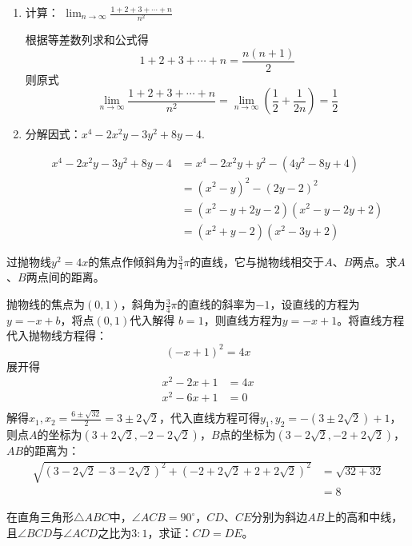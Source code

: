 \documentclass[answers]{exam}
\begin{document}
\begin{questions}
\begin{enumerate}[label=(\arabic*)]
\begin{solution}
		      \end{solution}
		\item 计算： \( \displaystyle \lim_{n\to\infty}\frac{1+2+3+\cdots+n}{n^2} \)
		      \begin{solution}
			      根据等差数列求和公式得
			      \begin{equation*}
				      1 + 2 + 3 + \cdots + n = \frac{n(n+1)}{2}
			      \end{equation*}
			      则原式
			      \begin{equation*}
				      \lim_{n\to\infty}\frac{1+2+3+\cdots+n}{n^2} = \lim_{n\to\infty}(\frac12 + \frac{1}{2n}) = \frac12
			      \end{equation*}
		      \end{solution}
		\item 分解因式：$ x^4 - 2x^2y - 3y^2 + 8y - 4 $.
		      \begin{solution}
			      \begin{align*}
				      x^4 - 2x^2y - 3y^2 + 8y - 4 & = x^4 - 2x^2y + y^2 - (4y^2 - 8y + 4)  \\
				                                  & = (x^2 - y)^2 - (2y - 2)^2             \\
				                                  & = (x^2 - y + 2y - 2)(x^2 - y - 2y + 2) \\
				                                  & = (x^2 + y - 2)(x^2 - 3y + 2)
			      \end{align*}
		      \end{solution}
	\end{enumerate}
	\question 过抛物线$ y^2 = 4x
	$的焦点作倾斜角为$\frac34\pi$的直线，它与抛物线相交于$A$、$B$两点。求$A$、$B$两点间的距离。
	\begin{solution}
		抛物线的焦点为$(0,1)$，斜角为$\frac34\pi$的直线的斜率为$-1$，设直线的方程为$ y = -x + b $，将点$(0,1)$代入解得
		$b = 1$，则直线方程为$ y=-x+1 $。将直线方程代入抛物线方程得：
		\begin{equation*}
			(-x + 1)^2 = 4x
		\end{equation*}
		展开得
		\begin{align*}
			x^2 - 2x + 1 & = 4x \\
			x^2 -6x + 1  & = 0  \\
		\end{align*}
		解得$ x_1,x_2 = \frac{6 \pm \sqrt{32}}{2} = 3 \pm 2\sqrt{2} $，代入直线方程可得$ y_1,y_2 = -(3\pm2\sqrt{2}) +
			1$，则点$A$的坐标为$(3+2\sqrt{2}, -2 - 2\sqrt{2})$，$B$点的坐标为$(3-2\sqrt{2}, -2 + 2\sqrt{2})$，$AB$的距离为：
		\begin{align*}
			\sqrt{(3-2\sqrt{2} - 3 - 2\sqrt{2})^2 + (-2 + 2\sqrt{2} + 2 + 2\sqrt{2})^2}
			 & = \sqrt{32 + 32} \\
			 & = 8
		\end{align*}
	\end{solution}
	\question 在直角三角形$ \triangle{ABC} $中，$ \angle{ACB} = 90^\circ
	$，$CD$、$CE$分别为斜边$AB$上的高和中线，且$\angle{BCD}$与$\angle{ACD}$之比为$3:1$，求证：$CD=DE$。


\end{questions}
\end{document}
